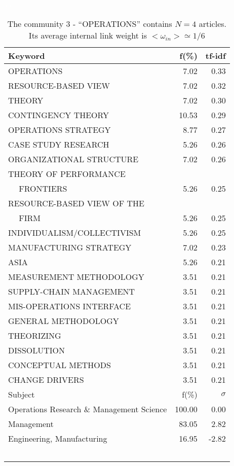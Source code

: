 \documentclass[a4paper,11pt]{report}
\begin{document}
\begin{landscape}
\begin{table}[!ht]
\caption{The community 3 - ``OPERATIONS'' contains $N = 4$ articles. Its average internal link weight is $<\omega_{in}> \simeq 1/6$ }
\textcolor{white}{aa}\\
{\scriptsize\begin{tabular}{|l r  r|}
\hline
Keyword & f(\%) & tf-idf \\
\hline
OPERATIONS & 7.02 & 0.33\\
RESOURCE-BASED VIEW & 7.02 & 0.32\\
THEORY & 7.02 & 0.30\\
CONTINGENCY THEORY & 10.53 & 0.29\\
OPERATIONS STRATEGY & 8.77 & 0.27\\
CASE STUDY RESEARCH & 5.26 & 0.26\\
ORGANIZATIONAL STRUCTURE & 7.02 & 0.26\\
THEORY OF PERFORMANCE &  &\\
$\quad$ FRONTIERS & 5.26 & 0.25\\
RESOURCE-BASED VIEW OF THE &  &\\
$\quad$ FIRM & 5.26 & 0.25\\
INDIVIDUALISM/COLLECTIVISM & 5.26 & 0.25\\
MANUFACTURING STRATEGY & 7.02 & 0.23\\
ASIA & 5.26 & 0.21\\
MEASUREMENT METHODOLOGY & 3.51 & 0.21\\
SUPPLY-CHAIN MANAGEMENT & 3.51 & 0.21\\
MIS-OPERATIONS INTERFACE & 3.51 & 0.21\\
GENERAL METHODOLOGY & 3.51 & 0.21\\
THEORIZING & 3.51 & 0.21\\
DISSOLUTION & 3.51 & 0.21\\
CONCEPTUAL METHODS & 3.51 & 0.21\\
CHANGE DRIVERS & 3.51 & 0.21\\
\hline
\hline
Subject & f(\%) & $\sigma$\\
\hline
Operations Research \& Management Science & 100.00 & 0.00\\
Management & 83.05 & 2.82\\
Engineering, Manufacturing & 16.95 & -2.82\\
 &  & \\
 &  & \\
 &  & \\
 &  & \\
 &  & \\

\end{tabular}}
\end{table}
\end{landscape}
\end{document}

